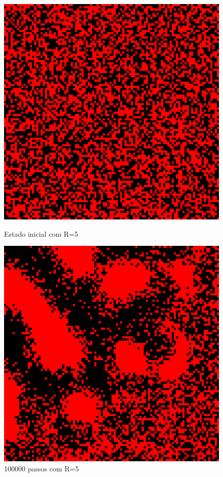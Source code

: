 \documentclass[conference]{IEEEtran}
\begin{document}
\begin{figure}[h!]
  \begin{minipage}[b]{0.5\linewidth}
    \label{fig:r5} 
    \centering
    \includegraphics[width=.8\linewidth]{resultados/5-0.png} 
    \caption{Estado inicial com R=5} 
    \vspace{4ex}
  \end{minipage}%
  \begin{minipage}[b]{0.5\linewidth}
    \centering
    \includegraphics[width=.8\linewidth]{resultados/5-1.png} 
    \caption{100000 passos com R=5} 
    \vspace{4ex}

\end{minipage}
\end{figure}
\end{document}
